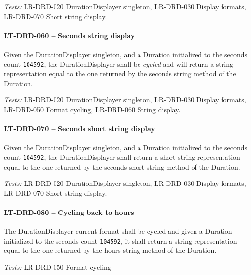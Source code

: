 \textit{Tests: } LR-DRD-020 DurationDisplayer singleton,
LR-DRD-030 Display formats, LR-DRD-070 Short string
display.

\paragraph{LT-DRD-060 -- Seconds string display}
Given the DurationDisplayer singleton, and a Duration initialized
to the seconds count \lstinline{104592}, the DurationDisplayer
shall be \emph{cycled} and will return a string representation equal to
the one returned by the seconds string method of the Duration.

\textit{Tests: } LR-DRD-020 DurationDisplayer singleton,
LR-DRD-030 Display formats, LR-DRD-050 Format cycling, LR-DRD-060 String
display.

\paragraph{LT-DRD-070 -- Seconds short string display}
Given the DurationDisplayer singleton, and a Duration initialized
to the seconds count \lstinline{104592}, the DurationDisplayer
shall return a short string representation equal to
the one returned by the seconds short string method of the Duration.

\textit{Tests: } LR-DRD-020 DurationDisplayer singleton,
LR-DRD-030 Display formats, LR-DRD-070 Short string
display.

\paragraph{LT-DRD-080 -- Cycling back to hours}
The DurationDisplayer current format shall be cycled and
given a Duration initialized to the seconds count \lstinline{104592},
it shall return a string representation equal to the one returned
by the hours string method of the Duration.

\textit{Tests: } LR-DRD-050 Format cycling
